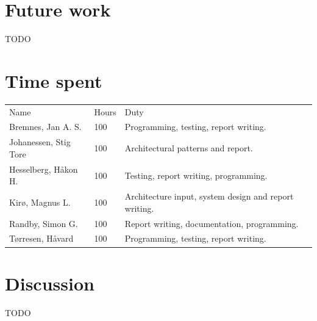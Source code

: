 \documentclass[12pt, a4paper]{article}
\begin{document}
\section{Future work}
TODO


\section{Time spent}
\begin{tabular}{  p{} p{} p{} }
    Name & Hours &  Duty \\
    Bremnes, Jan A. S. & 100  & Programming, testing, report writing.\\
    Johanessen, Stig Tore & 100 & Architectural patterns and report.\\
    Hesselberg, Håkon H. & 100 & Testing, report writing, programming.\\
    Kirø, Magnus L. & 100 & Architecture input, system design and report writing.\\
    Randby, Simon G. & 100 & Report writing, documentation, programming.\\
    Tørresen, Håvard & 100 & Programming, testing, report writing.\\
\end{tabular}

\section{Discussion}
TODO
\end{document}
